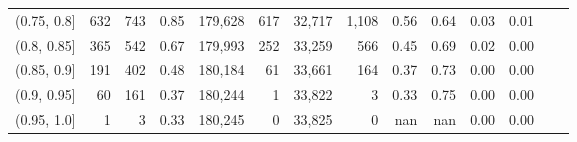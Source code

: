 \begin{tabular}{rrrrrrrrrrrrrr}
(0.75, 0.8]    &     632 &    743 &   0.85 &  179,628 &      617 &  32,717 &   1,108 &  0.56 &  0.64 &  0.03 &      0.01 \\
(0.8, 0.85]    &     365 &    542 &   0.67 &  179,993 &      252 &  33,259 &     566 &  0.45 &  0.69 &  0.02 &      0.00 \\
(0.85, 0.9]    &     191 &    402 &   0.48 &  180,184 &       61 &  33,661 &     164 &  0.37 &  0.73 &  0.00 &      0.00 \\
(0.9, 0.95]    &      60 &    161 &   0.37 &  180,244 &        1 &  33,822 &       3 &  0.33 &  0.75 &  0.00 &      0.00 \\
(0.95, 1.0]    &       1 &      3 &   0.33 &  180,245 &        0 &  33,825 &       0 &   nan &   nan &  0.00 &      0.00 \\
\bottomrule
\end{tabular}
